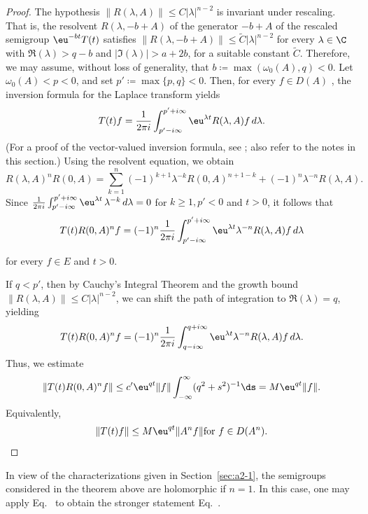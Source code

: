 \begin{proof} 
The hypothesis $\| R(\lambda, A) \| \leq C | \lambda |^{n-2}$ is invariant under rescaling. 
That is, the resolvent $R(\lambda, -b+A)$ of the generator $-b+A$ of the rescaled semigroup $\eu^{-bt} T(t)$ satisfies
$\| R(\lambda, -b+A) \| \leq \tilde{C} | \lambda |^{n-2}$ for every $\lambda \in \C$ with $\Re(\lambda) > q-b$ and $| \Im(\lambda) | > a+2b$, for a suitable constant $\tilde{C}$. 
Therefore, we may assume, without loss of generality, that $b \coloneq  \max(\omega_{0}(A), q) < 0$. 
Let $\omega_{0}(A) < p < 0$, and set $p' \coloneq  \max\{p, q\} < 0$. 
Then, for every $f \in D(A)$ , the inversion formula for the Laplace transform yields 
\begin{equation} \label{eq:a4-1.12}
T(t) f = \frac{1}{2\pi i} \int_{p' - i\infty}^{p' + i\infty} \eu^{\lambda t} R(\lambda, A) f \, d\lambda.
\end{equation}
 (For a proof of the vector-valued inversion formula, see \textcite[p.66]{widder:1946}; also refer to the notes in this section.)
Using the resolvent equation, we obtain 
\[ 
R(\lambda, A)^n R(0, A) = \sum_{k=1}^{n} (-1)^{k+1} \lambda^{-k} R(0, A)^{n+1-k} + (-1)^n \lambda^{-n} R(\lambda, A).
\]
Since 
$ \frac {1}{2\pi i} \int_{p' - i\infty}^{p' + i\infty} \eu^{\lambda t} \, \lambda^{-k} \, d\lambda = 0 $ for $ k \geq 1, p' < 0 $ and $ t > 0$, it follows that
 \begin{equation}\label{eq:a4-1.13}
   T(t) R(0, A)^n f = (-1)^n \frac{1}{2\pi i} \int_{p' - i\infty}^{p' + i\infty} \eu^{\lambda t} \lambda^{-n} R(\lambda, A) f \, d\lambda
    \end{equation}
    
 for every $f \in E$ and $t > 0$.
    
 If\/ $q < p'$, then by Cauchy's Integral Theorem and the growth bound $\| R(\lambda, A) \| \leq C | \lambda |^{n-2}$, we can shift the path of integration to 
 $\Re(\lambda) = q$, yielding
\[
    T(t) R(0, A)^n f = (-1)^n \frac{1}{2\pi i} \int_{q - i\infty}^{q + i\infty} \eu^{\lambda t} \lambda^{-n} R(\lambda, A) f \, d\lambda.
\]
Thus, we estimate  
\[
\| T(t) R(0,A)^n f \| \leq c' \eu^{q t} \| f \| \int_{-\infty}^{\infty} (q^2 + s^2)^{-1}\ds = M \eu^{q t} \| f \|.
\]
Equivalently,
\[
\| T(t) f \| \leq M \eu^{q t} \| A^n f \| \text{for $f \in D(A^n)$.}
\qedhere
\]
\end{proof}
In view of the characterizations given in Section~\ref{sec:a2-1},  the semigroups considered in the theorem above are holomorphic if\/ $ n = 1 $. 
In this case, one may apply Eq.~ to obtain the stronger statement Eq.~.

